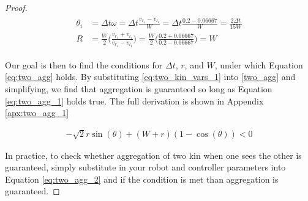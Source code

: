 \documentclass[conference]{IEEEtran}
\begin{document}
\begin{proof}
    \begin{align}
      \begin{split} \label{eq:theta_and_r}
        \theta_i &= \Delta t\omega = \Delta t \frac{v_{r_1} - v_{l_1}}{W} = \Delta t \frac{0.2 - 0.06667}{W} = \frac{2\Delta t}{15W} \\
        R &= \frac{W}{2}\bigg(\frac{v_{r_1} + v_{l_1}}{v_{r_1} - v_{l_1}}\bigg) = \frac{W}{2}\bigg(\frac{0.2 + 0.06667}{0.2 - 0.06667}\bigg) = W
      \end{split}
    \end{align}

      Our goal is then to find the conditions for $\Delta t$, $r$, and $W$, under which Equation \eqref{eq:two_agg} holds. By substituting \eqref{eq:two_kin_vars_1} into \eqref{two_agg} and simplifying, we find that aggregation is guaranteed so long as Equation \eqref{eq:two_agg_1} holds true. The full derivation is shown in Appendix \ref{apx:two_agg_1}

      \begin{equation} \label{eq:two_agg_1}
        \begin{split}
          -\sqrt{2}r\sin(\theta) + (W+r)(1 - \cos(\theta)) < 0
        \end{split}
      \end{equation}

      In practice, to check whether aggregation of two kin when one sees the other is guaranteed, simply substitute in your robot and controller parameters into Equation \eqref{eq:two_agg_2} and if the condition is met than aggregation is guaranteed.
    \end{proof}
\end{document}
